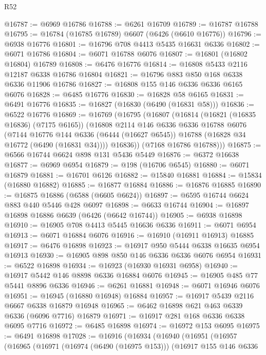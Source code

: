 \begin{lexlean}{R52}
\begin{coremodule}
@16787 := @6969 @16786
@16788 := @6261 @16709
@16789 := @16787 @16788
@16795 := @16784 (@16785 @16789) @6607 (@6426 (@6610 @16776))
@16796 := @6938 @16776
@16801 := @16796 @708 @4413 @5435 @16631 @6336
@16802 := @6071 @16786
@16804 := @6071 @16788 @6076
@16807 := @16801 (@16802 @16804) @16789
@16808 := @6476 @16776
@16814 := @16808 @5433 @2116 @12187 @6338 @16786 @16804
@16821 := @16796 @883 @850 @168 @6338 @6336 @11906 @16786
@16827 := @16808 @155 @146 @6336 @6336 @6165 @6076
@16828 := @6485 @16776
@16830 := @16828 @58 @6165
@16831 := @6491 @16776
@16835 := @16827 (@16830 (@6490 (@16831 @58)))
@16836 := @6522 @16776
@16869 := @16769
    (@16795
      (@16807
        (@16814
          (@16821 (@16835 @16836) (@7175 @6165))
          (@16808
            @2114
            @146
            @6336
            @6336
            @16788
            @6076
            (@7144
              @16776
              @144
              @6336
              (@6444 (@16627 @6545))
              @16788
              (@16828 @34 @16772 (@6490 (@16831 @34))))
            @16836))
        (@7168 @16786 @16788)))
@16875 := @6566 @16744 @6624 @898 @131 @5436 @5449
@16876 := @6372 @16638
@16877 := @6969 @6954
@16879 := @198 (@16706 @6545)
@16880 := @6071 @16879
@16881 := @16701 @6126
@16882 := @15840 @16881
@16884 := @15834 (@16880 @16882)
@16885 := @16877 @16884
@16886 := @16876 @16885
@16890 := @16875 @16886 (@6588 (@6605 @6624))
@16897 := @6595 @16744 @6624 @883 @440 @5446 @428 @6097
@16898 := @6633 @16744
@16904 := @16897 @16898 @16886 @6639 (@6426 (@6642 @16744))
@16905 := @6938 @16898
@16910 := @16905 @708 @4413 @5445 @16636 @6336
@16911 := @6071 @6954
@16913 := @6071 @16884 @6076
@16916 := @16910 (@16911 @16913) @16885
@16917 := @6476 @16898
@16923 := @16917 @950 @5444 @6338 @16635 @6954 @16913
@16930 := @16905 @898 @850 @146 @6336 @6336 @6076 @6954
@16931 := @6522 @16898
@16934 := @16923 (@16930 @16931 @6958)
@16940 := @16917 @5442 @146 @8898 @6336 @16884 @6076
@16945 := @16905 @485 @77 @5441 @8896 @6336
@16946 := @6261 @16881
@16948 := @6071 @16946 @6076
@16951 := @16945 (@16880 @16948) @16884
@16957 := @16917 @5439 @2116 @6667 @6338 @16879 @16948
@16965 := @6462 @16898 @621 @463 @6339 @6336 (@6096 @7716) @16879
@16971 := @16917 @281 @168 @6336 @6338 @6095 @7716
@16972 := @6485 @16898
@16974 := @16972 @153 @6095
@16975 := @6491 @16898
@17028 := @16916
    (@16934
      (@16940
        (@16951
          (@16957
            (@16965
              (@16971
                (@16974 (@6490 (@16975 @153)))
                (@16917
                  @155
                  @146
                  @6336

\end{coremodule}
\end{lexlean}
